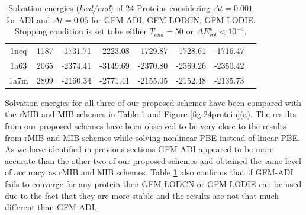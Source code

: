 \begin{table}[!ht]
\begin{tabular}{ c c c c c c c c}
1neq & 1187 & -1731.71 & -2223.08 & -1729.87 & -1728.61 & -1716.47 \\
1a63 & 2065 & -2374.41 & -3149.69 & -2370.80 & -2369.26 & -2350.42 \\
1a7m & 2809 & -2160.34 & -2771.41 & -2155.05 & -2152.48 & -2135.73 \\ \hline
\end{tabular}
\caption{Solvation energies ({\it kcal/mol}) of 24 Proteins considering $\Delta t = 0.001$ for ADI and $\Delta t =0.05$ for GFM-ADI, GFM-LODCN, GFM-LODIE. Stopping condition is set tobe either $T_{end}=50$ or $\Delta E^n_{sol}<10^{-4}$.}  
\label{tab:24protein}
\end{table}


Solvation energies for all three of our proposed schemes have been compared  with the rMIB and MIB schemes in Table \ref{tab:24protein} and Figure \ref{fig:24protein}(a). The results from our proposed schemes have been observed to be very close to the results from rMIB and MIB schemes while solving nonlinear PBE instead of linear PBE. As we have identified in previous sections GFM-ADI  appeared to be more accurate than the other two of our proposed schemes and obtained the same level of accuracy as rMIB and MIB schemes. Table \ref{tab:24protein} also confirms that if GFM-ADI fails to converge for any protein then GFM-LODCN or GFM-LODIE can be used due to the fact that they are more stable and the results are not that much different than GFM-ADI.   

